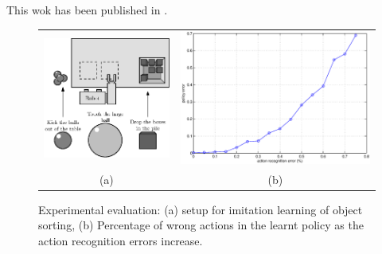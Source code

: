 This wok has been published in \cite{montesano:etal:2007}.
\begin{figure}
\begin{tabular}{cc}
\includegraphics[width=0.45\columnwidth]{images/Recycler.eps} &
\includegraphics[width=0.45\columnwidth]{images/error.eps} \\
(a) & (b) \\
\end{tabular}
\caption{Experimental evaluation: (a) setup for imitation learning of
  object sorting, (b) Percentage of wrong actions in the learnt policy
  as the action recognition errors increase.}
\label{fig:manipulation:experim}
\end{figure}

\endinput
